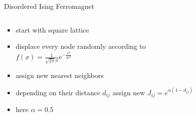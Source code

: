 \documentclass{beamer}
\begin{document}
        \begin{frame}{Disordered Ising Ferromagnet}
            \begin{columns}[t]
                \begin{column}{5cm}
                    \begin{itemize}
                        \item<1-> start with square lattice
                        \item<2-> displace every node randomly according to\\
                            \(f(x)=\frac{1}{\sqrt{2\pi}\sigma}\mathrm{e}^{-\frac{x^2}{2\sigma^2}}\)
                        \item<3-> assign new nearest neighbors
                        \item<4-> depending on their distance \(d_{ij}\) assign new \(J_{ij} = e^{\alpha(1-d_{ij})}\)
                        \item<4-> here \(\alpha = 0.5\)
                    \end{itemize}
                \end{column}
                \begin{column}{6cm}
                \end{column}
            \end{columns}
        \end{frame}
\end{document}
